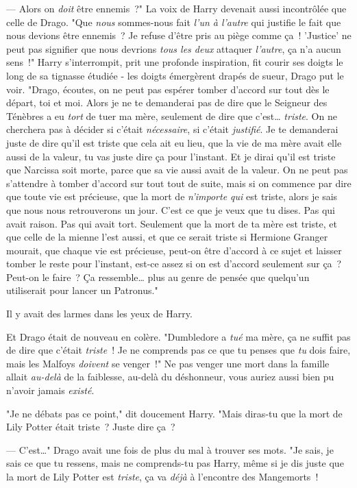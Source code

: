 --- Alors on \emph{doit} être ennemis~?" La voix de Harry devenait aussi incontrôlée que celle de Drago. "Que \emph{nous} sommes-nous fait \emph{l'un à l'autre} qui justifie le fait que nous devions être ennemis~? Je refuse d'être pris au piège comme ça~! 'Justice' ne peut pas signifier que nous devrions \emph{tous les deux} attaquer \emph{l'autre}, ça n'a aucun sens~!" Harry s'interrompit, prit une profonde inspiration, fit courir ses doigts le long de sa tignasse étudiée - les doigts émergèrent drapés de sueur, Drago put le voir. "Drago, écoutes, on ne peut pas espérer tomber d'accord sur tout dès le départ, toi et moi. Alors je ne te demanderai pas de dire que le Seigneur des Ténèbres a eu \emph{tort} de tuer ma mère, seulement de dire que c'est… \emph{triste}. On ne cherchera pas à décider si c'était \emph{nécessaire}, si c'était \emph{justifié}. Je te demanderai juste de dire qu'il est triste que cela ait eu lieu, que la vie de ma mère avait elle aussi de la valeur, tu vas juste dire ça pour l'instant. Et je dirai qu'il est triste que Narcissa soit morte, parce que sa vie aussi avait de la valeur. On ne peut pas s'attendre à tomber d'accord sur tout tout de suite, mais si on commence par dire que toute vie est précieuse, que la mort de \emph{n'importe qui} est triste, alors je sais que nous nous retrouverons un jour. C'est ce que je veux que tu dises. Pas qui avait raison. Pas qui avait tort. Seulement que la mort de ta mère est triste, et que celle de la mienne l'est aussi, et que ce serait triste si Hermione Granger mourait, que chaque vie est précieuse, peut-on être d'accord à ce sujet et laisser tomber le reste pour l'instant, est-ce assez si on est d'accord seulement sur ça~? Peut-on le faire~? Ça ressemble… plus au genre de pensée que quelqu'un utiliserait pour lancer un Patronus."

Il y avait des larmes dans les yeux de Harry.

Et Drago était de nouveau en colère. "Dumbledore a \emph{tué} ma mère, ça ne suffit pas de dire que c'était \emph{triste}~! Je ne comprends pas ce que tu penses que \emph{tu} dois faire, mais les Malfoys \emph{doivent} se venger~!" Ne pas venger une mort dans la famille allait \emph{au-delà} de la faiblesse, au-delà du déshonneur, vous auriez aussi bien pu n'avoir jamais \emph{existé}.

"Je ne débats pas ce point," dit doucement Harry. "Mais diras-tu que la mort de Lily Potter était triste~? Juste dire ça~?

--- C'est…" Drago avait une fois de plus du mal à trouver ses mots. "Je sais, je sais ce que tu ressens, mais ne comprends-tu pas Harry, même si je dis juste que la mort de Lily Potter est \emph{triste}, ça va \emph{déjà} à l'encontre des Mangemorts~!

